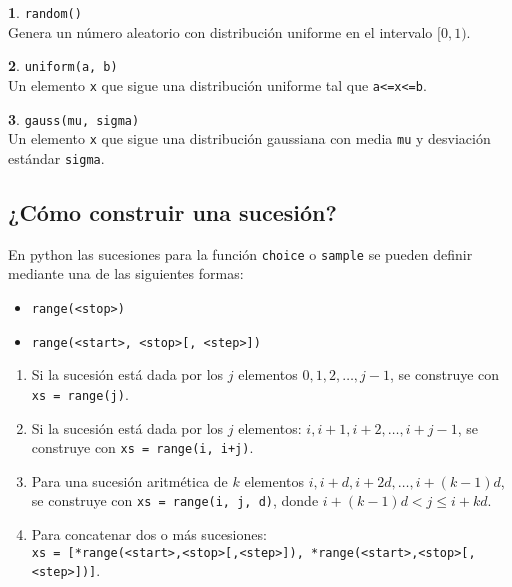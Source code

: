 \documentclass[12pt]{article}
\theoremstyle{definition}
\newtheorem{funcion}{}[section]
\begin{document}
\begin{funcion}
  \verb|random()| \\[1ex]
  Genera un número aleatorio con distribución uniforme en el intervalo $[0, 1)$.
\end{funcion}

\begin{funcion}
  \verb|uniform(a, b)| \\[1ex]
  Un elemento \verb|x| que sigue una distribución uniforme tal que \verb|a<=x<=b|.
\end{funcion}

\begin{funcion}
  \verb|gauss(mu, sigma)| \\[1ex]
  Un elemento \verb|x| que sigue una distribución gaussiana con media \verb|mu| y desviación estándar \verb|sigma|.
\end{funcion}

\subsection{¿Cómo construir una sucesión?}

En python las sucesiones para la funci\'on \verb|choice| o \verb|sample| se pueden definir mediante una de las siguientes formas:
\begin{itemize}
  \item \verb|range(<stop>)|
  \item \verb|range(<start>, <stop>[, <step>])|
\end{itemize}


\begin{enumerate}
  \item Si la sucesión está dada por los $j$ elementos $0, 1, 2, \dots, j - 1$, se construye con \verb|xs = range(j)|.
  \item Si la sucesión está dada por los $j$ elementos: $i, i+1, i+2, \dots, i + j - 1$, se construye con \verb|xs = range(i, i+j)|.
  \item Para una sucesión aritmética de $k$ elementos $i, i + d, i + 2d, \dots, i + (k-1)d$, se construye con \verb|xs = range(i, j, d)|, donde $i + (k-1)d < j \leq i + kd$.
  \item Para concatenar dos o m\'as sucesiones:\\[1ex]
    \verb|xs = [*range(<start>,<stop>[,<step>]), *range(<start>,<stop>[,<step>])]|.
\end{enumerate}
\end{document}

